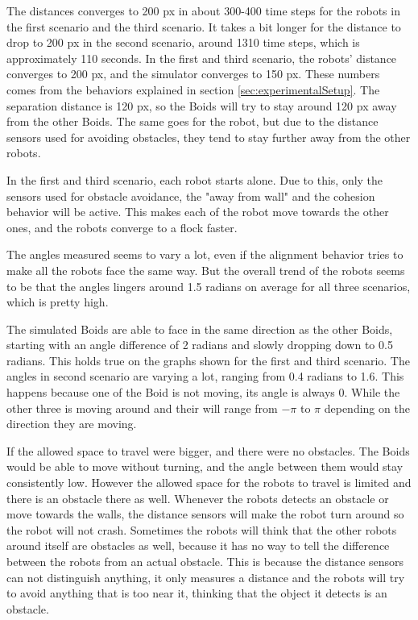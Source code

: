 The distances converges to 200 px in about 300-400 time steps for the robots in the first scenario and the third scenario. It takes a bit longer for the distance to drop to 200 px in the second scenario, around 1310 time steps, which is approximately 110 seconds. In the first and third scenario, the robots' distance converges to 200 px, and the simulator converges to 150 px. These numbers comes from the behaviors explained in section \ref{sec:experimentalSetup}. The separation distance is 120 px, so the Boids will try to stay around 120 px away from the other Boids. The same goes for the robot, but due to the distance sensors used for avoiding obstacles, they tend to stay further away from the other robots. 

In the first and third scenario, each robot starts alone. Due to this, only the sensors used for obstacle avoidance, the "away from wall" and the cohesion behavior will be active. This makes each of the robot move towards the other ones, and the robots converge to a flock faster. 

The angles measured seems to vary a lot, even if the alignment behavior tries to make all the robots face the same way. But the overall trend of the robots seems to be that the angles lingers around 1.5 radians on average for all three scenarios, which is pretty high.

The simulated Boids are able to face in the same direction as the other Boids, starting with an angle difference of 2 radians and slowly dropping down to 0.5 radians. This holds true on the graphs shown for the first and third scenario. The angles in second scenario are varying a lot, ranging from 0.4 radians to 1.6. This happens because one of the Boid is not moving, its angle is always 0. While the other three is moving around and their will range from $-\pi$ to $\pi$ depending on the direction they are moving.

If the allowed space to travel were bigger, and there were no obstacles. The Boids would be able to move without turning, and the angle between them would stay consistently low. However the allowed space for the robots to travel is limited and there is an obstacle there as well.
Whenever the robots detects an obstacle or move towards the walls, the distance sensors will make the robot turn around so the robot will not crash. Sometimes the robots will think that the other robots around itself are obstacles as well, because it has no way to tell the difference between the robots from an actual obstacle. This is because the distance sensors can not distinguish anything, it only measures a distance and the robots will try to avoid anything that is too near it, thinking that the object it detects is an obstacle.

